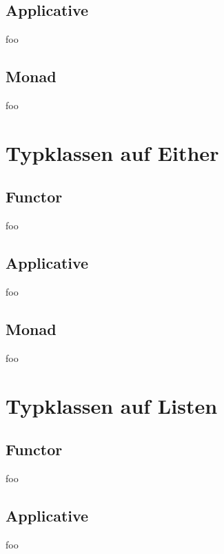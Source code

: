 \documentclass{beamer}
\begin{document}
\subsection{Applicative}
\begin{frame}
 foo
\end{frame}

\subsection{Monad}
\begin{frame}
 foo
\end{frame}

\section{Typklassen auf Either}
\subsection{Functor}
\begin{frame}
 foo
\end{frame}

\subsection{Applicative}
\begin{frame}
 foo
\end{frame}

\subsection{Monad}
\begin{frame}
 foo
\end{frame}

\section{Typklassen auf Listen}
\subsection{Functor}
\begin{frame}
 foo
\end{frame}

\subsection{Applicative}
\begin{frame}
 foo
\end{frame}
\end{document}
